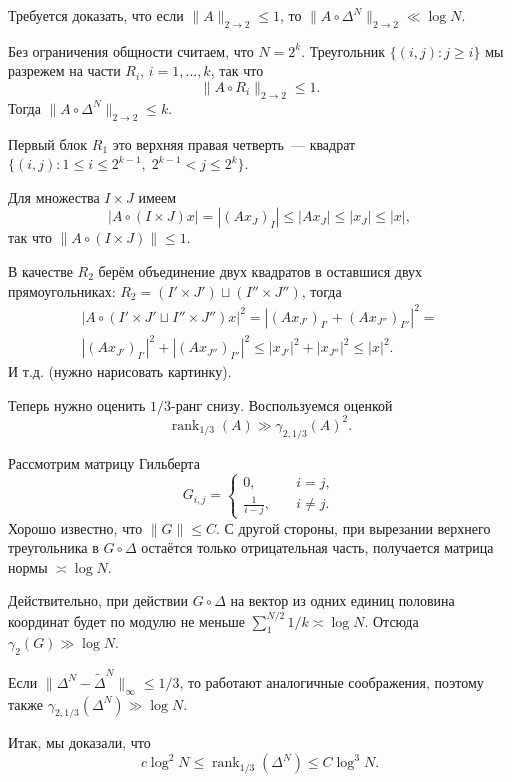 \documentclass[handout]{beamer}
\renewcommand\le{\leqslant}
\renewcommand\ge{\geqslant}
\DeclareMathOperator{\rank}{rank}
\begin{document}
\begin{frame}
    Требуется доказать, что если $\|A\|_{2\to2}\le 1$, то
    $\|A\circ\Delta^N\|_{2\to2}\ll \log N$.
    \pause

    Без ограничения общности считаем, что $N=2^k$. Треугольник $\{(i,j)\colon
    j\ge i\}$ мы разрежем на части $R_i$, $i=1,\ldots,k$, так что
    $$
    \|A\circ R_i\|_{2\to2}\le 1.
    $$
    \pause
    Тогда $\|A\circ\Delta^N\|_{2\to2}\le k$.
    \pause

    Первый блок $R_1$ это верхняя правая четверть~--- квадрат $\{(i,j)\colon
    1\le i\le 2^{k-1},\;2^{k-1}< j\le 2^k\}$.
    \pause
    
    Для множества $I\times J$ имеем
    $$
    |A\circ(I\times J)x|=|(Ax_J)_I| \le |Ax_J| \le |x_J| \le |x|,
    $$
    так что $\|A\circ(I\times J)\|\le 1$.
    \pause

    В качестве $R_2$ берём объединение двух квадратов в оставшися двух
    прямоугольниках: $R_2=(I'\times J')\sqcup (I''\times J'')$, тогда
    \begin{multline*}
    |A\circ(I'\times J' \sqcup I''\times J'')x|^2=|(Ax_{J'})_{I'} +
    (Ax_{J''})_{I''}|^2 = \\ |(Ax_{J'})_{I'}|^2 + |(Ax_{J''})_{I''}|^2 \le
    |x_{J'}|^2 + |x_{J''}|^2 \le |x|^2.
    \end{multline*}
    И т.д. (нужно нарисовать картинку).
\end{frame}


\begin{frame}
    Теперь нужно оценить $1/3$-ранг снизу. Воспользуемся оценкой
    $$
    \rank_{1/3}(A)\gg \gamma_{2,1/3}(A)^2.
    $$
    \pause\vspace{5pt}

    Рассмотрим матрицу Гильберта
    $$
    G_{i,j}=\begin{cases}
        0,&\quad i=j,\\
        \frac{1}{i-j},&\quad i\ne j.
    \end{cases}
    $$
    \pause
    Хорошо известно, что $\|G\|\le C$.
    С другой стороны, при вырезании верхнего треугольника в $G\circ\Delta$
    остаётся только отрицательная часть, получается матрица нормы $\asymp\log
    N$.
    \pause
    
    Действительно, при действии $G\circ\Delta$ на вектор из одних
    единиц половина координат будет по модулю не меньше
    $\sum_1^{N/2}1/k\asymp\log N$. Отсюда $\gamma_2(G)\gg\log N$.
    \pause

    Если $\|\Delta^N-\widetilde\Delta^N\|_\infty\le 1/3$, то работают
    аналогичные соображения, поэтому также $\gamma_{2,1/3}(\Delta^N)\gg\log N$.
    \pause
    
    Итак, мы доказали, что
    $$
    c\log^2 N \le \rank_{1/3}(\Delta^N) \le C\log^3N.
    $$
    
\end{frame}
\end{document}
